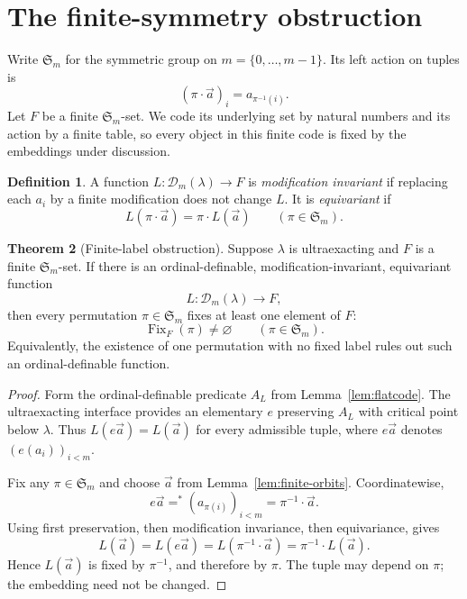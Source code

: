 \documentclass[11pt,letterpaper]{article}
\theoremstyle{definition}
\newtheorem{definition}{Definition}[section]
\newtheorem{theorem}[definition]{Theorem}
\newcommand{\Fix}{\operatorname{Fix}}
\newcommand{\Sym}{\mathfrak S}
\newcommand{\DD}{\mathcal D}
\newcommand{\fineq}{\mathrel{=^{*}}}
\begin{document}
\section{The finite-symmetry obstruction}\label{sec:finite}

Write $\Sym_m$ for the symmetric group on $m=\{0,\ldots,m-1\}$. Its left action on tuples is
\[
 (\pi\cdot\vec a)_i=a_{\pi^{-1}(i)}.
\]
Let $F$ be a finite $\Sym_m$-set. We code its underlying set by natural numbers and its action by a finite table, so every object in this finite code is fixed by the embeddings under discussion.

\begin{definition}
A function $L:\DD_m(\lambda)\to F$ is \emph{modification invariant} if replacing each $a_i$ by a finite modification does not change $L$. It is \emph{equivariant} if
\[
 L(\pi\cdot\vec a)=\pi\cdot L(\vec a)
 \qquad(\pi\in\Sym_m).
\]
\end{definition}

\begin{theorem}[Finite-label obstruction]\label{thm:finite-label}
Suppose $\lambda$ is ultraexacting and $F$ is a finite $\Sym_m$-set. If there is an ordinal-definable, modification-invariant, equivariant function
\[
 L:\DD_m(\lambda)\longrightarrow F,
\]
then every permutation $\pi\in\Sym_m$ fixes at least one element of $F$:
\begin{equation}\label{eq:finite-fixedpoint}
 \Fix_F(\pi)\neq\varnothing\qquad(\pi\in\Sym_m).
\end{equation}
Equivalently, the existence of one permutation with no fixed label rules out such an ordinal-definable function.
\end{theorem}

\begin{proof}
Form the ordinal-definable predicate $A_L$ from Lemma~\ref{lem:flatcode}. The ultraexacting interface provides an elementary $e$ preserving $A_L$ with critical point below $\lambda$. Thus $L(e\vec a)=L(\vec a)$ for every admissible tuple, where $e\vec a$ denotes $(e(a_i))_{i<m}$.

Fix any $\pi\in\Sym_m$ and choose $\vec a$ from Lemma~\ref{lem:finite-orbits}. Coordinatewise,
\[
 e\vec a\fineq(a_{\pi(i)})_{i<m}=\pi^{-1}\cdot\vec a.
\]
Using first preservation, then modification invariance, then equivariance, gives
\[
 L(\vec a)=L(e\vec a)
        =L(\pi^{-1}\cdot\vec a)
        =\pi^{-1}\cdot L(\vec a).
\]
Hence $L(\vec a)$ is fixed by $\pi^{-1}$, and therefore by $\pi$. The tuple may depend on $\pi$; the embedding need not be changed.
\end{proof}
\end{document}
